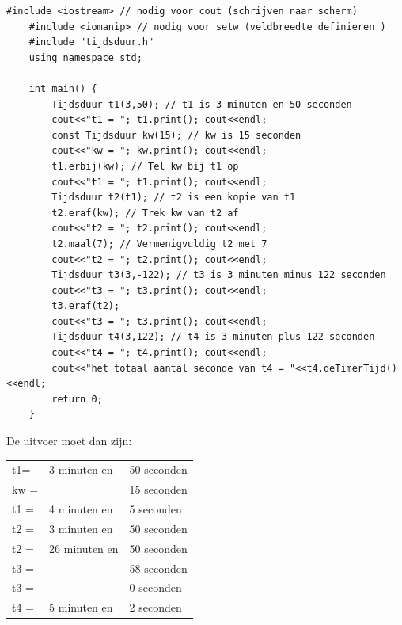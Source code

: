 \begin{lstlisting}[caption= de implementatiefile van het hoofdprogramma ,label={lst:tijdsdMainprog},numbers=none]
	#include <iostream> // nodig voor cout (schrijven naar scherm)
	#include <iomanip> // nodig voor setw (veldbreedte definieren )
	#include "tijdsduur.h"
	using namespace std;
	
	int main() {
		Tijdsduur t1(3,50); // t1 is 3 minuten en 50 seconden
		cout<<"t1 = "; t1.print(); cout<<endl;
		const Tijdsduur kw(15); // kw is 15 seconden
		cout<<"kw = "; kw.print(); cout<<endl;
		t1.erbij(kw); // Tel kw bij t1 op
		cout<<"t1 = "; t1.print(); cout<<endl;
		Tijdsduur t2(t1); // t2 is een kopie van t1
		t2.eraf(kw); // Trek kw van t2 af
		cout<<"t2 = "; t2.print(); cout<<endl;
		t2.maal(7); // Vermenigvuldig t2 met 7
		cout<<"t2 = "; t2.print(); cout<<endl;
		Tijdsduur t3(3,-122); // t3 is 3 minuten minus 122 seconden
		cout<<"t3 = "; t3.print(); cout<<endl;
		t3.eraf(t2); 
		cout<<"t3 = "; t3.print(); cout<<endl;
		Tijdsduur t4(3,122); // t4 is 3 minuten plus 122 seconden
		cout<<"t4 = "; t4.print(); cout<<endl;
		cout<<"het totaal aantal seconde van t4 = "<<t4.deTimerTijd()<<endl;
		return 0;
	}	
\end{lstlisting}
De uitvoer moet dan zijn:

\begin{tabular}{ l l l }
	t1= & 3 minuten en & 50 seconden \\ 
	kw	=& &15	seconden \\  
	t1	=&	4	minuten en&	5	seconden\\
	t2	=&	3	minuten en	&50	seconden\\
	t2	=&	26	minuten en	&50	seconden\\
	t3	=&			&58	seconden\\
	t3	=&			&0	seconden\\
	t4	=&	5	minuten en	&2	seconden
	
\end{tabular}

